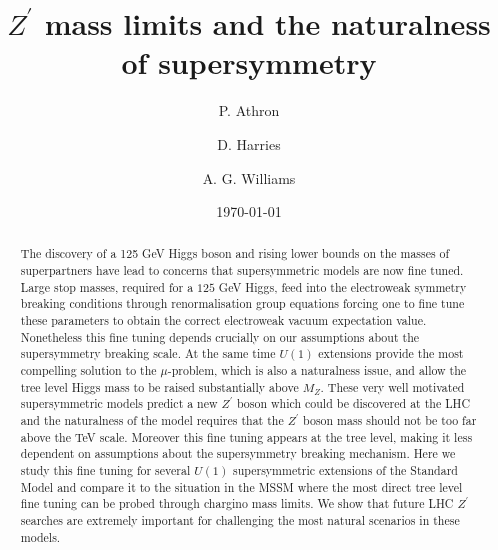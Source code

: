 \documentclass[preprint,amsmath,amssymb,aps,superscriptaddress,prd,showpacs,floatfix,nofootinbib]{revtex4-1}
\begin{document}
\title {$Z^\prime$ mass limits and the naturalness of supersymmetry}

\author{P. Athron}

\author{D. Harries}

\author{A. G. Williams}

\date{\today}%

\begin{abstract}

The discovery of a 125 GeV Higgs boson and rising lower bounds on the
masses of superpartners have lead to concerns that supersymmetric
models are now fine tuned.  Large stop masses, required for a $125$
GeV Higgs, feed into the electroweak symmetry breaking conditions 
through renormalisation group equations forcing one to fine tune these 
parameters to obtain the correct electroweak vacuum expectation value.  
Nonetheless this fine tuning depends crucially on our assumptions about 
the supersymmetry breaking scale.  At the same time $U(1)$ extensions
provide the most compelling solution to the $\mu$-problem, which is also 
a naturalness issue, and allow the tree level Higgs mass to be raised substantially above $M_Z$. These very well motivated supersymmetric models 
predict a new $Z^\prime$ boson which could be discovered at the LHC and the
naturalness of the model requires that the $Z^\prime$ boson mass
should not be too far above the TeV scale.  Moreover this fine tuning
appears at the tree level, making it less dependent on assumptions
about the supersymmetry breaking mechanism.  Here we study this fine tuning for
several $U(1)$ supersymmetric extensions of the Standard Model and
compare it to the situation in the MSSM where the most direct tree
level fine tuning can be probed through chargino mass limits.  We show
that future LHC $Z^\prime$ searches are extremely important for
challenging the most natural scenarios in these models.









\end{abstract}
\end{document}
